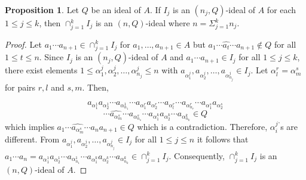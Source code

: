 \documentclass[preprint,review,10pt]{amsart}
\theoremstyle{definition}
\newtheorem{proposition}[theorem]{Proposition}
\theoremstyle{remark}
\numberwithin{equation}{section}
\begin{document}
\begin{proposition} \label{4}
Let $Q$ be an   ideal of $A$. If $I_j$ is an $(n_j,Q)$-ideal of $A$ for each $1 \leq j \leq k$, then $\cap_{j=1}^k I_j$ is an $(n,Q)$-ideal where $n=\Sigma_{j=1}^k n_j$. 
\end{proposition}
\begin{proof}
Let $a_1 \cdots a_{n+1} \in \cap_{j=1}^k I_j$ for $a_1,\ldots,a_{n+1} \in A$ but $a_1\cdots \widehat{a_t} \cdots a_{n+1} \notin Q$ for all $1 \leq t \leq n$.  Since $I_j$ is an $(n_j,Q)$-ideal of $A$ and $a_1 \cdots a_{n+1} \in I_j$ for all $1 \leq j \leq k$, there exist elements  $1 \leq \alpha_1^j, \alpha_2^j,\ldots,\alpha_{n_j}^j \leq n$ with $a_{\alpha_1^j}, a_{\alpha_2^j},\ldots,a_{\alpha_{n_j}^j}  \in I_j$. Let $\alpha_l^r=\alpha_m^s$ for pairs $r,l$ and $s,m$. Then,  


\[a_{\alpha_1^1}  a_{\alpha_2^1}  \cdots  a_{\alpha_{n_1}^1}   \cdots a_{\alpha_1^r}  a_{\alpha_2^r}   \cdots   a_{\alpha_l^r}   \cdots   a_{\alpha_ {n_r}^r}   \cdots    a_{\alpha_1^s}   a_{\alpha_2^s}\]
\[ \cdots       \widehat{a_{\alpha_m^s}} \cdots  a_{\alpha_{n_s}^s} \cdots    a_{\alpha_1^k}   a_{\alpha_2^k}   \cdots   a_{\alpha_{n_k}^k} \in Q \]
which implies $a_1 \cdots \widehat{a_{\alpha_m^s}} \cdots a_na_{n+1} \in Q$ which is a contradiction. Therefore,  ${\alpha_i^j}^,$s are different. From $a_{\alpha_1^j}, a_{\alpha_2^j},\ldots,a_{\alpha_{n_j}^j}  \in I_j$ for all $1 \leq j \leq n$ it follows that $a_1 \cdots a_n=a_{\alpha_1^1}  a_{\alpha_2^1}  \cdots  a_{\alpha_{n_1}^1} \cdots a_{\alpha_1^k}   a_{\alpha_2^k}   \cdots   a_{\alpha_{n_k}^k} \in \cap_{j=1}^k I_j$. Consequently, $\cap_{j=1}^k I_j$ is an $(n,Q)$-ideal of $A$.
\end{proof}
\end{document}
